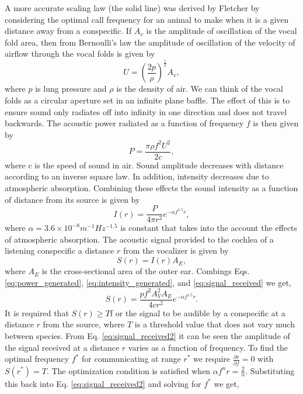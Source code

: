 \documentclass[12pt, letter]{report}
\begin{document}
A more accurate scaling law (the solid line) was derived by Fletcher by considering the optimal call frequency for an animal to make when it is a given distance away from a conspecific. If $A_v$ is the amplitude of oscillation of the vocal fold area, then from Bernoulli's law the amplitude of oscillation of the velocity of airflow through the vocal folds is given by
\begin{equation}  
U = \left( \frac{2p}{\rho} \right)^\frac{1}{2}A_v,
\end{equation}
where $p$ is lung pressure and $\rho$ is the density of air. We can think of the vocal folds as a circular aperture set in an infinite plane baffle. The effect of this is to ensure sound only radiates off into infinity in one direction and does not travel backwards. The acoustic power radiated as a function of frequency $f$ is then given by
\begin{equation}
\label{eq:power_generated}
P = \frac{\pi \rho f^2 U^2}{2 c},
\end{equation}
where c is the speed of sound in air. Sound amplitude decreases with distance according to an inverse square law. In addition, intensity decreases due to atmospheric absorption. Combining these effects the sound intensity as a function of distance from its source is given by
\begin{equation}
\label{eq:intensity_generated}
I(r) = \frac{P}{4 \pi r^2} e^{-\alpha f^1.5 r},
\end{equation}
where $\alpha=3.6 \times 10^{-8} m^{-1} Hz^{-1.5}$ is constant that takes into the account the effects of atmospheric absorption. The acoustic signal provided to the cochlea of a listening conspecific a distance $r$ from the vocalizer is given by
\begin{equation}
\label{eq:signal_received}
S(r) = I(r) A_E,
\end{equation}
where $A_E$ is the cross-sectional area of the outer ear. Combings Eqs. \ref{eq:power_generated}, \ref{eq:intensity_generated}, and \ref{eq:signal_received} we get,
\begin{equation}
\label{eq:signal_received2}
S(r) = \frac{p f^2 A_V^2 A_E}{4 c r^2} e^{-\alpha f^1.5 r}.
\end{equation}
It is required that $S(r) \geq T$f or the signal to be audible by a conspecific at a distance $r$ from the source, where $T$ is a threshold value that does not vary much between species. From Eq. \ref{eq:signal_received2} it can be seen the amplitude of the signal received at a distance $r$ varies as a function of frequency. To find the optimal frequency $f^*$ for communicating at range $r^*$ we require $\frac{\partial r}{\partial f}=0$ with $S(r^*)=T$. The optimization condition is satisfied when $\alpha f^n r = \frac{2}{n}$. Substituting this back into Eq. \ref{eq:signal_received2} and solving for $f^*$ we get,
\end{document}
